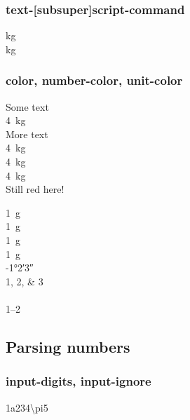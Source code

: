 \documentclass{article}
\begin{document}
\subsubsection{text-[sub\textbar super]script-command}
{
 \unit{\kg{}} \\
 \newcommand*\mysubscript[1]{\textsubscript{\textcolor{blue}{#1}}}
 \newcommand\mysuperscript[1]{\textsuperscript{\textcolor{green}{#1}}}
 \unit{\kg{}} %
}

\subsubsection{color, number-color, unit-color} %
{
 \color{red}%
 Some text \\
 \qty{4}{\kilogram} \\
 More text \\
 \qty[color = blue]{4}{\kilogram} \\
 \qty[number-color = blue]{4}{\kilogram} \\
 \qty[unit-color = blue]{4}{\kilogram} \\
 Still red here!
}

\qty[number-color=blue,color=green]{1}{\gram} \\
\qty[color=green,number-color=blue]{1}{\gram} \\
\qty[unit-color=blue,color=green]{1}{\gram} \\
\qty[color=green,unit-color=blue]{1}{\gram} \\
\ang[number-color=green,unit-color=blue]{-1;2;3} \\
\numlist{1;2;3}\\
\\
\numrange{1}{2}


\subsection{Parsing numbers}

\subsubsection{input-digits, input-ignore}
\num[input-ignore=3a\pi]{1a234\pi5}
\end{document}

